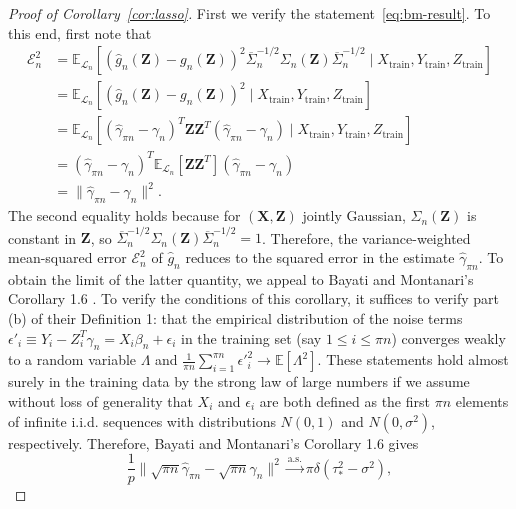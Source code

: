 \documentclass[12pt]{article}
\theoremstyle{definition}
\theoremstyle{remark}
\newcommand{\eps}{\epsilon}
\newcommand{\prx}{\bm X}
\newcommand{\srx}{X}
\newcommand{\prz}{\bm Z}
\newcommand{\srz}{Z}
\newcommand{\sry}{Y}
\newcommand{\seps}{\epsilon}
\begin{document}
\begin{proof}[Proof of Corollary~\ref{cor:lasso}]

First we verify the statement~\eqref{eq:bm-result}. To this end, first note that
\begin{equation}
	\begin{split}
		\mathcal E_n^2 &=  \mathbb E_{\mathcal L_n}[(\widehat g_n(\prz) - g_n(\prz))^2\overline \Sigma_n^{-1/2}\Sigma_n(\prz)\overline \Sigma_n^{-1/2} \mid \srx_{\text{train}}, \sry_{\text{train}}, \srz_{\text{train}}] \\
		&= \mathbb E_{\mathcal L_n}[(\widehat g_n(\prz) - g_n(\prz))^2 \mid \srx_{\text{train}}, \sry_{\text{train}}, \srz_{\text{train}}] \\
		&= \mathbb E_{\mathcal L_n}[(\widehat \gamma_{\pi n} - \gamma_n)^T \prz \prz^T (\widehat \gamma_{\pi n} - \gamma_n) \mid \srx_{\text{train}}, \sry_{\text{train}}, \srz_{\text{train}}] \\
		&= (\widehat \gamma_{\pi n} - \gamma_n)^T\mathbb E_{\mathcal L_n}[ \prz \prz^T](\widehat \gamma_{\pi n} - \gamma_n) \\
		&= \|\widehat \gamma_{\pi n} - \gamma_n\|^2.
		\label{eq:error}
	\end{split}
\end{equation}
The second equality holds because for $(\prx, \prz)$ jointly Gaussian, $\Sigma_n(\prz)$ is constant in $\prz$, so $\overline \Sigma_n^{-1/2}\Sigma_n(\prz)\overline \Sigma_n^{-1/2} = 1$.
Therefore, the variance-weighted mean-squared error $\mathcal E_n^2$ of $\widehat g_n$ reduces to the squared error in the estimate $\widehat \gamma_{\pi n}$. To obtain the limit of the latter quantity, we appeal to Bayati and Montanari's Corollary 1.6 \cite{Bayati2011}. To verify the conditions of this corollary, it suffices to verify part (b) of their Definition 1: that the empirical distribution of the noise terms $\seps'_i \equiv \sry_i - \srz_i^T \gamma_n = \srx_i \beta_n + \seps_i$ in the training set (say $1 \leq i \leq \pi n$) converges weakly to a random variable $\Lambda$ and $\frac{1}{\pi n}\sum_{i = 1}^{\pi n} \eps'^2_i \rightarrow \mathbb E[\Lambda^2]$. These statements hold almost surely in the training data by the strong law of large numbers if we assume without loss of generality that $\srx_i$ and $\seps_i$ are both defined as the first $\pi n$ elements of infinite i.i.d. sequences with distributions $N(0,1)$ and $N(0,\sigma^2)$, respectively. Therefore, Bayati and Montanari's Corollary 1.6 gives 
\begin{equation}
	\frac{1}{p}\|\sqrt{\pi n}\widehat \gamma_{\pi n} - \sqrt{\pi n}\gamma_n\|^2 \overset{\text{a.s.}}\rightarrow \pi\delta(\tau_*^2 - \sigma^2),

\end{equation}
\end{proof}
\end{document}
